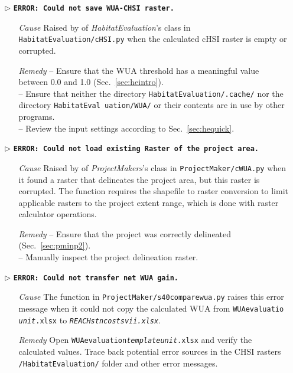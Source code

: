\begin{itemize}
	\item[$\triangleright$]\textbf{\texttt{ERROR: Could not save WUA-CHSI raster.}}
	\begin{itemize}
		\item[\textit{Cause}\hspace{0.27cm}] Raised by  of \textit{HabitatEvaluation}'s  class in \texttt{HabitatEvaluation/cHSI.py} when the calculated cHSI raster is empty or corrupted.
		\item[\textit{Remedy}] -- Ensure that the WUA threshold has a meaningful value between 0.0 and 1.0 (Sec.~\ref{sec:heintro}).\\
							 -- Ensure that neither the directory \texttt{HabitatEvaluation/.cache/} nor the directory \texttt{HabitatEval uation/WUA/} or their contents are in use by other programs.\\
							 -- Review the input settings according to Sec.~\ref{sec:hequick}.\\
	\end{itemize}
	
	\item[$\triangleright$]\textbf{\texttt{ERROR: Could not load existing Raster of the project area.}}
	\begin{itemize}
		\item[\textit{Cause}\hspace{0.27cm}] Raised by  of \textit{ProjectMakers}'s  class in \texttt{ProjectMaker/cWUA.py} when it found a raster that delineates the project area, but this raster is corrupted. The function requires the shapefile to raster conversion to limit applicable rasters to the project extent range, which is done with raster calculator operations.
		\item[\textit{Remedy}] -- Ensure that the project was correctly delineated (Sec.~\ref{sec:pminp2}).\\
							 -- Manually inspect the project delineation raster.\\
	\end{itemize}
	
	\item[$\triangleright$]\textbf{\texttt{ERROR: Could not transfer net WUA gain.}}
	\begin{itemize}
		\item[\textit{Cause}\hspace{0.27cm}] The  function in \texttt{ProjectMaker/s40{\myUnderscore}compare{\myUnderscore}wua.py} raises this error message when it could not copy the calculated WUA from \texttt{WUA{\myUnderscore}evaluatio\\\textit{{\myUnderscore}unit}.xlsx} to \texttt{\emph{REACH{\myUnderscore}stn{\myUnderscore}costs{\myUnderscore}vii.xlsx}}.
		\item[\textit{Remedy}] Open \texttt{WUA{\myUnderscore}evaluation\textit{{\myUnderscore}template{\myUnderscore}unit}.xlsx} and verify the calculated values. Trace back potential error sources in the CHSI rasters \texttt{/HabitatEvaluation/} folder and other error messages.\\
	\end{itemize}	
	

\end{itemize}
